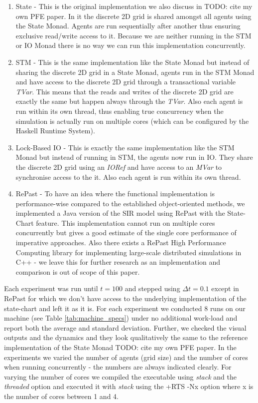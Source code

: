 \begin{enumerate}
	\item State - This is the original implementation we also discuss in TODO: cite my own PFE paper. In it the discrete 2D grid is shared amongst all agents using the State Monad. Agents are run sequentially after another thus ensuring exclusive read/write access to it. Because we are neither running in the STM or IO Monad there is no way we can run this implementation concurrently.
	\item STM - This is the same implementation like the State Monad but instead of sharing the discrete 2D grid in a State Monad, agents run in the STM Monad and have access to the discrete 2D grid through a transactional variable \textit{TVar}. This means that the reads and writes of the discrete 2D grid are exactly the same but happen always through the \textit{TVar}. Also each agent is run within its own thread, thus enabling true concurrency when the simulation is actually run on multiple cores (which can be configured by the Haskell Runtime System).
	\item Lock-Based IO - This is exactly the same implementation like the STM Monad but instead of running in STM, the agents now run in IO. They share the discrete 2D grid using an \textit{IORef} and have access to an \textit{MVar} to synchronise access to the it. Also each agent is run within its own thread.
	\item RePast - To have an idea where the functional implementation is performance-wise compared to the established object-oriented methods, we implemented a Java version of the SIR model using RePast with the State-Chart feature. This implementation cannot run on multiple cores concurrently but gives a good estimate of the single core performance of imperative approaches. Also there exists a RePast High Performance Computing library for implementing large-scale distributed simulations in C++ - we leave this for further research as an implementation and comparison is out of scope of this paper.
\end{enumerate}

Each experiment was run until $t = 100$ and stepped using $\Delta t = 0.1$ except in RePast for which we don't have access to the underlying implementation of the state-chart and left it as it is. For each experiment we conducted 8 runs on our machine (see Table \ref{tab:machine_specs}) under no additional work-load and report both the average and standard deviation. Further, we checked the visual outputs and the dynamics and they look qualitatively the same to the reference implementation of the State Monad TODO: cite my own PFE paper. In the experiments we varied the number of agents (grid size) and the number of cores when running concurrently - the numbers are always indicated clearly. For varying the number of cores we compiled the executable using \textit{stack} and the \textit{threaded} option and executed it with \textit{stack} using the +RTS -Nx option where x is the number of cores between 1 and 4. 

